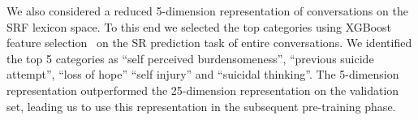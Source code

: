 \documentclass[letterpaper]{article} %
\begin{document}

We also considered a  reduced 5-dimension representation of conversations on the SRF lexicon space.  To this end we selected the  top categories using XGBoost feature selection~\cite{chen2016xgboost} on the SR prediction task of entire conversations.
We identified the top 5 categories as ``self perceived burdensomeness'', ``previous suicide attempt'', ``loss of hope'' ``self injury'' and ``suicidal thinking''.  The 5-dimension representation outperformed the 25-dimension representation on the validation set, leading us to use  this representation in the subsequent pre-training phase.



\end{document}

